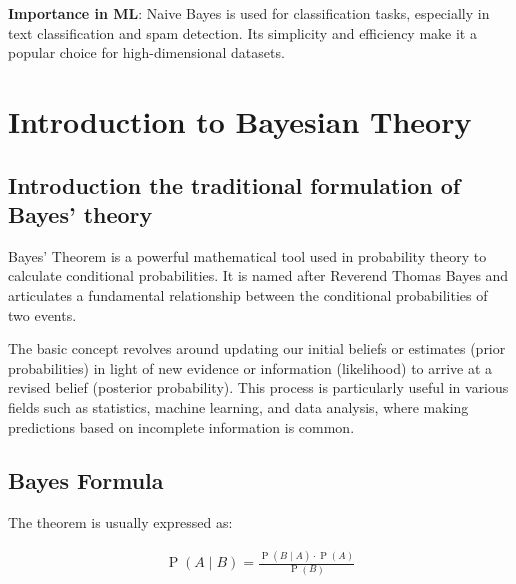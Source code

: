 \documentclass[
  12 pt,
  a4paper,
]{book}
\numberwithin{equation}{section}
\theoremstyle{plain}      %
\theoremstyle{definition} %
\theoremstyle{remark}     %
\theoremstyle{note}         %
\begin{document}
\textbf{Importance in ML}: Naive Bayes is used for classification tasks,
especially in text classification and spam detection. Its simplicity and
efficiency make it a popular choice for high-dimensional datasets.

\vspace*{\fill}

\newpage

\hypertarget{introduction-to-bayesian-theory}{%
\section{Introduction to Bayesian
Theory}\label{introduction-to-bayesian-theory}}

\hypertarget{introduction-the-traditional-formulation-of-bayes-theory}{%
\subsection{Introduction the traditional formulation of Bayes'
theory}\label{introduction-the-traditional-formulation-of-bayes-theory}}

Bayes' Theorem is a powerful mathematical tool used in probability
theory to calculate conditional probabilities. It is named after
Reverend Thomas Bayes and articulates a fundamental relationship between
the conditional probabilities of two events.

The basic concept revolves around updating our initial beliefs or
estimates (prior probabilities) in light of new evidence or information
(likelihood) to arrive at a revised belief (posterior probability). This
process is particularly useful in various fields such as statistics,
machine learning, and data analysis, where making predictions based on
incomplete information is common.

\hypertarget{bayes-formula}{%
\subsection{Bayes Formula}\label{bayes-formula}}

The theorem is usually expressed as:

\begin{align}
\operatorname{P}(A\! \mid\! B)=\frac{\operatorname{P}(B\! \mid\! A) \cdot \operatorname{P}(A)}{\operatorname{P}(B)}
\end{align}
\end{document}
